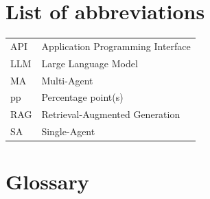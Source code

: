 \chapter*{List of abbreviations}

\noindent\begin{tabular}{@{}p{4.6cm}p{10.4cm}@{}}
API & Application Programming Interface\\
LLM & Large Language Model\\
MA & Multi-Agent\\
pp & Percentage point(s)\\
RAG & Retrieval-Augmented Generation\\
SA & Single-Agent\\
\end{tabular}

\chapter*{Glossary}


